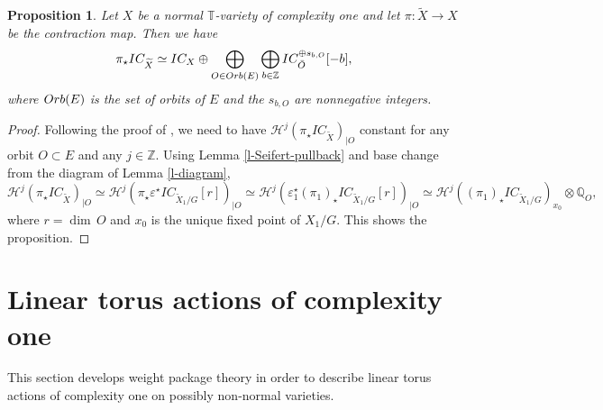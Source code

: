 \documentclass[11pt, reqno]{amsart}
\theoremstyle{plain}
\newtheorem{proposition}[theorem]{Proposition}
\theoremstyle{definition}
\theoremstyle{remark}
\begin{document}
\begin{proposition}\label{theo-decomp1}
Let $X$ be a normal $\mathbb{T}$-variety of complexity one
and let $\pi:\widetilde{X}\rightarrow X$ be the contraction map. Then we have
$$\pi_{\star} IC_{\widetilde{X}}\simeq IC_{X} \oplus \bigoplus_{O\in {\rm Orb}(E)}\bigoplus_{b\in \mathbb{Z}} IC_{\bar{O}}^{\oplus s_{b, O}}[-b],$$
where ${\rm Orb}(E)$ is the set of orbits of $E$ and the $s_{b, O}$ are nonnegative integers.
\end{proposition}
\begin{proof} Following the proof of  \cite[Theorem 1.1 (ii)]{AL21}, we need to have
$\mathcal{H}^{j}(\pi_{\star}IC_{\widetilde{X}})_{|O}$ constant for any orbit $O\subset  E$
and any $j\in \mathbb{Z}$. Using Lemma \ref{l-Seifert-pullback} and base change \cite[Theorem 2.3.26]{Dim04} from the diagram of Lemma \ref{l-diagram},
$$\mathcal{H}^{j}(\pi_{\star} IC_{\widetilde{X}})_{|O}\simeq \mathcal{H}^{j}(\pi_{\star} \varepsilon^{\star}IC_{\widetilde{X}_{1}/G}[r])_{|O}\simeq  \mathcal{H}^{j}(\varepsilon^{\star}_{1}(\pi_{1})_{\star} IC_{\widetilde{X}_{1}/G}[r])_{|O}\simeq \mathcal{H}^{j}((\pi_{1})_{\star} IC_{\widetilde{X}_{1}/G})_{x_{0}}\otimes \mathbb{Q}_{O},$$
where $r  =  \dim\, O$ and $x_{0}$ is the unique fixed point of $X_{1}/G$. This shows the proposition.
\end{proof}


\section{Linear torus actions of complexity one}\label{sec-four}
This section develops weight package theory in order to describe linear torus actions of complexity one on possibly non-normal varieties.
\end{document}
